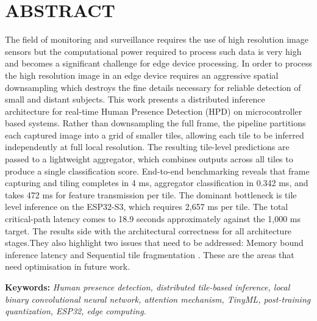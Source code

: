 \chapter*{ABSTRACT}
{}
The field of monitoring and surveillance requires the use of high resolution image sensors  but the computational power required to process such data is very high and becomes a significant challenge for edge device processing.  In order to process the high resolution image in an edge device requires an aggressive spatial downsampling which destroys the fine details necessary for reliable detection of small and distant subjects. This work presents a distributed inference architecture for real-time Human Presence Detection (HPD) on microcontroller based systems.  Rather than downsampling the full frame, the pipeline partitions each captured image into a grid of smaller tiles, allowing each tile to be inferred independently at full local resolution. The resulting tile-level predictions are passed to a lightweight aggregator, which combines outputs across all tiles to produce a single classification score.
End-to-end benchmarking reveals that frame capturing and tiling completes in 4 ms, aggregator classification in 0.342 ms, and takes 472 ms for feature transmission per tile. The dominant bottleneck is tile level inference on the ESP32-S3, which requires 2,657 ms per tile.‎  The total critical-path latency comes to 18.9‎  seconds approximately against the 1,000 ms target. The results side with the architectural correctness for all architecture stages.They also highlight two issues that need to be addressed: Memory bound inference latency and Sequential tile fragmentation . These are the areas that need optimisation in future work.

\vspace{1em}

\textbf{Keywords:}\textit{ Human presence detection, distributed tile-based inference, local binary convolutional neural network, attention mechanism, TinyML, post-training quantization, ESP32, edge computing.}

